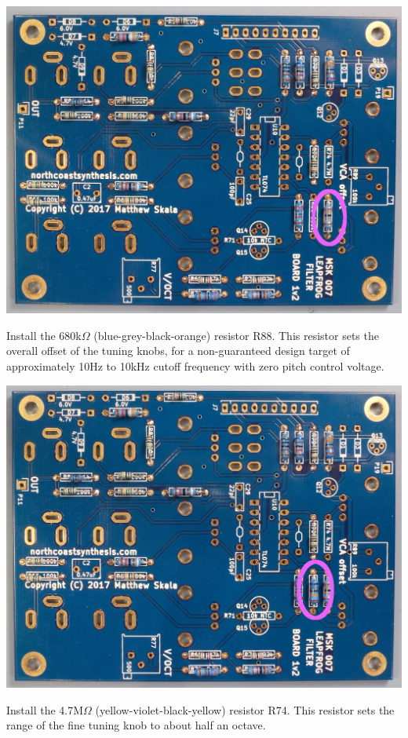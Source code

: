 \nopagebreak
\noindent\includegraphics[width=\linewidth]{res-240k1.jpg}

\pagebreak

Install the 680k$\Omega$ (blue-grey-black-orange) resistor R88.
This resistor sets the overall offset of the tuning knobs, for a
non-guaranteed design target of approximately 10Hz to 10kHz cutoff frequency
with zero pitch control voltage.

\nopagebreak
\noindent\includegraphics[width=\linewidth]{res-680k1.jpg}

Install the 4.7M$\Omega$ (yellow-violet-black-yellow) resistor R74.
This resistor sets the range of the fine tuning knob to about half an
octave.

